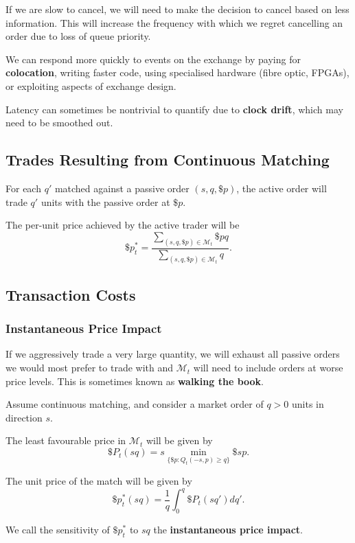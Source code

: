 \documentclass{article}
\begin{document}
If we are slow to cancel, we will need to make the decision to cancel based on less information. This will increase the frequency with which we regret cancelling an order due to loss of queue priority.

We can respond more quickly to events on the exchange by paying for \textbf{colocation}, writing faster code, using specialised hardware (fibre optic, FPGAs), or exploiting aspects of exchange design.

Latency can sometimes be nontrivial to quantify due to \textbf{clock drift}, which may need to be smoothed out.

\subsection{Trades Resulting from Continuous Matching}
For each $q'$ matched against a passive order $(s,q,\$p)$, the active order will trade $q'$ units with the passive order at $\$p$. %

The per-unit price achieved by the active trader will be
$$\$p^*_t = \frac{\sum_{(s,q,\$p)\in\mathcal{M}_t} \$pq}{\sum_{(s,q,\$p)\in\mathcal{M}_t} q}.$$ %

\subsection{Transaction Costs}
\subsubsection{Instantaneous Price Impact}
If we aggressively trade a very large quantity, we will exhaust all passive orders we would most prefer to trade with and $\mathcal{M}_t$ will need to include orders at worse price levels. This is sometimes known as \textbf{walking the book}.

Assume continuous matching, and consider a market order of $q>0$ units in direction $s$.

The least favourable price in $\mathcal{M}_t$ will be given by
$$\$P_t(sq) = s\min_{\{\$p : Q_t(-s,p)\geq q\}} \$sp.$$

The unit price of the match will be given by
$$\$p^*_t(sq) = \frac{1}{q}\int_0^q \$P_t(sq')dq'.$$

We call the sensitivity of $\$p^*_t$ to $sq$ the \textbf{instantaneous price impact}.%
\end{document}
